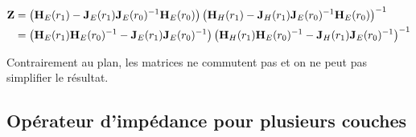 \begin{align}
    \mathbf{Z} &= 
    \left(\mathbf{H}_{E}(r_1) - \mathbf{J}_{E}(r_1)\mathbf{J}_{E}(r_0)^{-1}\mathbf{H}_{E}(r_0)\right)
    \left(\mathbf{H}_{H}(r_1) - \mathbf{J}_{H}(r_1)\mathbf{J}_{E}(r_0)^{-1}\mathbf{H}_{E}(r_0)\right)^{-1}
    \\
    &=
    \left(\mathbf{H}_{E}(r_1)\mathbf{H}_{E}(r_0)^{-1} - \mathbf{J}_{E}(r_1)\mathbf{J}_{E}(r_0)^{-1}\right)
    \left(\mathbf{H}_{H}(r_1)\mathbf{H}_{E}(r_0)^{-1} - \mathbf{J}_{H}(r_1)\mathbf{J}_{E}(r_0)^{-1}\right)^{-1}
\end{align}

Contrairement au plan, les matrices  ne commutent pas et on ne peut pas simplifier le résultat.

\subsection{Opérateur d'impédance pour plusieurs couches}
